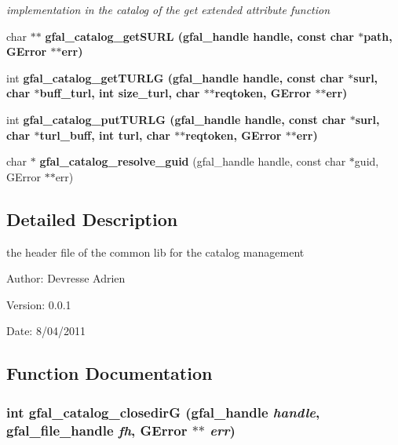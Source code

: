 \begin{CompactItemize}
\begin{CompactList}\small\item\em implementation in the catalog of the get extended attribute function \item\end{CompactList}\item 
char $\ast$$\ast$ \bf{gfal\_\-catalog\_\-get\-SURL} (gfal\_\-handle handle, const char $\ast$path, GError $\ast$$\ast$err)
\item 
int \bf{gfal\_\-catalog\_\-get\-TURLG} (gfal\_\-handle handle, const char $\ast$surl, char $\ast$buff\_\-turl, int size\_\-turl, char $\ast$$\ast$reqtoken, GError $\ast$$\ast$err)
\item 
int \bf{gfal\_\-catalog\_\-put\-TURLG} (gfal\_\-handle handle, const char $\ast$surl, char $\ast$turl\_\-buff, int turl, char $\ast$$\ast$reqtoken, GError $\ast$$\ast$err)
\item 
char $\ast$ \textbf{gfal\_\-catalog\_\-resolve\_\-guid} (gfal\_\-handle handle, const char $\ast$guid, GError $\ast$$\ast$err)\label{gfal__common__catalog_8h_4955825d7c275f3dfae9a57232642370}

\end{CompactItemize}


\subsection{Detailed Description}
the header file of the common lib for the catalog management 

\begin{Desc}
\item[Author:]Devresse Adrien \end{Desc}
\begin{Desc}
\item[Version:]0.0.1 \end{Desc}
\begin{Desc}
\item[Date:]8/04/2011 \end{Desc}


\subsection{Function Documentation}
\subsubsection{\setlength{\rightskip}{0pt plus 5cm}int gfal\_\-catalog\_\-closedir\-G (gfal\_\-handle {\em handle}, gfal\_\-file\_\-handle {\em fh}, GError $\ast$$\ast$ {\em err})}\label{gfal__common__catalog_8h_348fe15690faed2e2731d15eb6cc7856}



